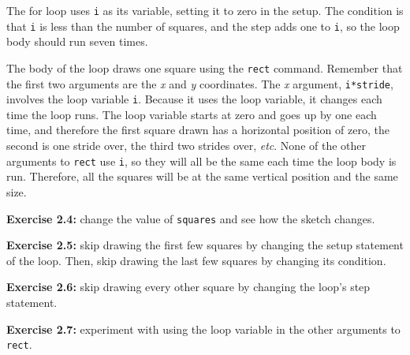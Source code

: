 \documentclass[
]{leaflet}
\begin{document}
The for loop uses \texttt{i} as its variable, setting it to zero in the setup.
The condition is that \texttt{i} is less than the number of squares, and the step adds one to \texttt{i}, so the loop body should run seven times.

The body of the loop draws one square using the \texttt{rect} command.
Remember that the first two arguments are the \textit{x} and \textit{y} coordinates.
The \textit{x} argument, \texttt{i*stride}, involves the loop variable \texttt{i}.
Because it uses the loop variable, it changes each time the loop runs.
The loop variable starts at zero and goes up by one each time, and therefore the first square drawn has a horizontal position of zero, the second is one stride over, the third two strides over, \textit{etc}.
None of the other arguments to \texttt{rect} use \texttt{i}, so they will all be the same each time the loop body is run.
Therefore, all the squares will be at the same vertical position and the same size.

\textbf{Exercise 2.4:} change the value of \texttt{squares} and see how the sketch changes.

\textbf{Exercise 2.5:} skip drawing the first few squares by changing the setup statement of the loop.
Then, skip drawing the last few squares by changing its condition.

\textbf{Exercise 2.6:} skip drawing every other square by changing the loop's step statement.

\textbf{Exercise 2.7:} experiment with using the loop variable in the other arguments to \texttt{rect}.



\loggingall
\end{document}
